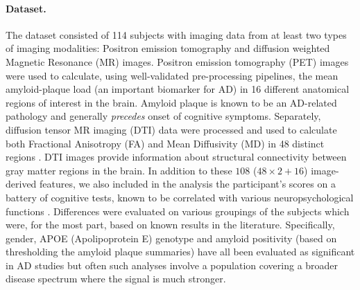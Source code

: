 \paragraph{Dataset.} The dataset consisted of 114 subjects with imaging data from at least two types of imaging modalities: Positron emission tomography and 
diffusion weighted Magnetic Resonance (MR) images. 
Positron emission tomography (PET) images were used to calculate, using well-validated pre-processing pipelines, 
the mean amyloid-plaque load (an important biomarker for AD) in 16 different anatomical regions of interest in the brain. 
Amyloid plaque is known to be an AD-related pathology and generally {\em precedes} onset of cognitive symptoms. 
Separately, diffusion tensor MR imaging (DTI) data were processed and used to calculate both Fractional Anisotropy (FA) and Mean Diffusivity (MD) in 48 distinct regions \citep{mori2008stereotaxic}. 
DTI images provide information about structural connectivity between gray matter regions in the brain. 
In addition to these $108$ ($48 \times 2 + 16$) image-derived features, 
we also included in the analysis the participant's scores on a battery of cognitive tests, known to be correlated with various neuropsychological functions \citep{lezak2004neuropsychological}. 
Differences were evaluated on various groupings of the subjects which were, for the most part, 
based on known results in the literature.   
Specifically, gender, APOE (Apolipoprotein E) genotype and amyloid positivity (based on thresholding the amyloid plaque summaries) have 
all been evaluated as significant in
AD studies \citep{racine2014associations} but often such analyses involve a population covering a broader disease spectrum where 
the signal is much stronger. 
%

